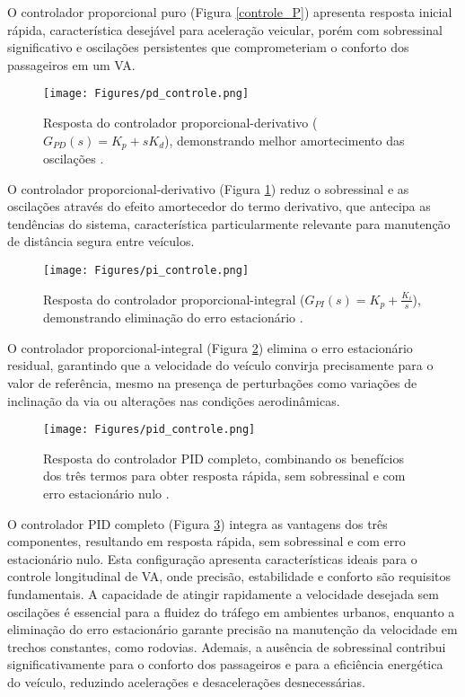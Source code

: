 O controlador proporcional puro (Figura \ref{controle_P}) apresenta resposta inicial rápida, característica desejável para aceleração veicular, porém com sobressinal significativo e oscilações persistentes que comprometeriam o conforto dos passageiros em um VA.

\begin{figure}[H]
\centering
\texttt{[image: Figures/pd\_controle.png]}
\caption{Resposta do controlador proporcional-derivativo ($G_{PD}(s) = K_p + sK_d$), demonstrando melhor amortecimento das oscilações \cite[Week 5 - Lesson 1: Proportional-Integral-Derivative (PID) Control. ~12min13s]{University_of_Toronto2018-fe}.}
\label{controle_D}
\end{figure}

O controlador proporcional-derivativo (Figura \ref{controle_D}) reduz o sobressinal e as oscilações através do efeito amortecedor do termo derivativo, que antecipa as tendências do sistema, característica particularmente relevante para manutenção de distância segura entre veículos.

\begin{figure}[H]
\centering
\texttt{[image: Figures/pi\_controle.png]}
\caption{Resposta do controlador proporcional-integral ($G_{PI}(s) = K_p + \frac{K_i}{s}$), demonstrando eliminação do erro estacionário \cite[Week 5 - Lesson 1: Proportional-Integral-Derivative (PID) Control. ~12min13s]{University_of_Toronto2018-fe}.}
\label{controle_I}
\end{figure}

O controlador proporcional-integral (Figura \ref{controle_I}) elimina o erro estacionário residual, garantindo que a velocidade do veículo convirja precisamente para o valor de referência, mesmo na presença de perturbações como variações de inclinação da via ou alterações nas condições aerodinâmicas.

\begin{figure}[H]
\centering
\texttt{[image: Figures/pid\_controle.png]}
\caption{Resposta do controlador PID completo, combinando os benefícios dos três termos para obter resposta rápida, sem sobressinal e com erro estacionário nulo \cite[Week 5 - Lesson 1: Proportional-Integral-Derivative (PID) Control. ~12min50s]{University_of_Toronto2018-fe}.}
\label{controle_pid}
\end{figure}

O controlador PID completo (Figura \ref{controle_pid}) integra as vantagens dos três componentes, resultando em resposta rápida, sem sobressinal e com erro estacionário nulo. Esta configuração apresenta características ideais para o controle longitudinal de VA, onde precisão, estabilidade e conforto são requisitos fundamentais. A capacidade de atingir rapidamente a velocidade desejada sem oscilações é essencial para a fluidez do tráfego em ambientes urbanos, enquanto a eliminação do erro estacionário garante precisão na manutenção da velocidade em trechos constantes, como rodovias. Ademais, a ausência de sobressinal contribui significativamente para o conforto dos passageiros e para a eficiência energética do veículo, reduzindo acelerações e desacelerações desnecessárias.


